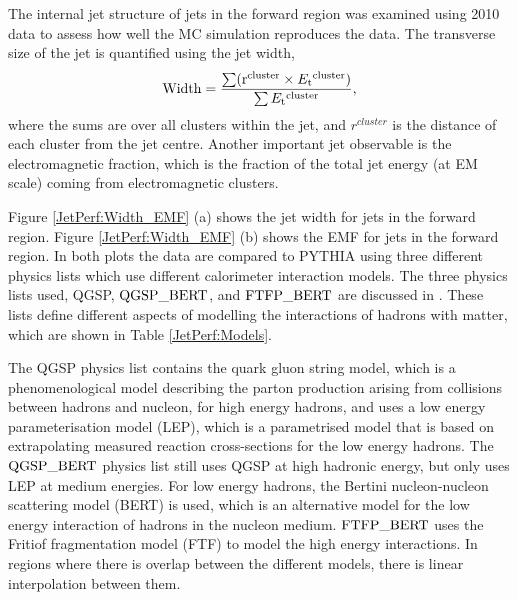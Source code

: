 The internal jet structure of jets in the forward region was examined using 2010 data to assess how well the MC simulation reproduces the data.
The transverse size of the jet is quantified using the jet width,
\begin{equation}
\rm{Width}=\frac{\sum (r^{cluster} \times \mbox{$E_{\rm t}$}{}^{cluster}) }{\sum \mbox{$E_{\rm t}$}{}^{cluster}},
\label{JetPerf:Width}
\end{equation}
where the sums are over all clusters within the jet, and $r^{cluster}$ is the distance of each cluster from the jet centre.
Another important jet observable is the electromagnetic fraction, which is the fraction of the total jet energy (at EM scale) coming from electromagnetic clusters.


Figure \ref{JetPerf:Width_EMF} (a) shows the jet width for jets in the forward region.
Figure \ref{JetPerf:Width_EMF} (b) shows the EMF for jets in the forward region.
In both plots the data are compared to PYTHIA using three different physics lists which use different calorimeter interaction models.
The three physics lists used, QGSP, $\rm QGSP\_BERT$, and $\rm FTFP\_BERT$ are discussed in \cite{ref:HadModels}. 
These lists define different aspects of modelling the interactions of hadrons with matter, which are shown in Table \ref{JetPerf:Models}.

The QGSP physics list contains the quark gluon string model, which is a phenomenological model describing the parton production arising from collisions between hadrons and nucleon, for high energy hadrons, and uses a low energy parameterisation model (LEP), which is a parametrised model that is based on extrapolating measured reaction cross-sections for the low energy hadrons.  
The $\rm{QGSP\_BERT}$ physics list still uses QGSP at high hadronic energy, but only uses LEP at medium energies.
For low energy hadrons, the Bertini nucleon-nucleon scattering model (BERT) is used, which is an alternative model for the low energy interaction of hadrons in  the nucleon medium.
$\rm{FTFP\_BERT}$ uses the  Fritiof fragmentation model (FTF) to model the high energy interactions. 
In regions where there is overlap between the different models, there is linear interpolation between them.


